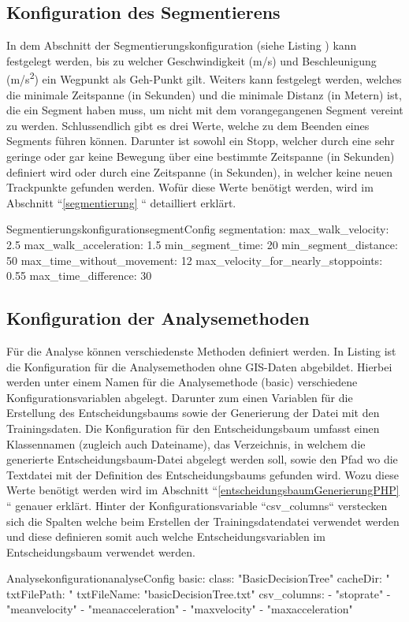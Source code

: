 \subsection{Konfiguration des Segmentierens}
In dem Abschnitt der Segmentierungskonfiguration (siehe Listing ) kann festgelegt werden, bis zu welcher Geschwindigkeit (m/s) und Beschleunigung (m/s\textsuperscript{2}) ein Wegpunkt als Geh-Punkt gilt. Weiters kann festgelegt werden, welches die minimale Zeitspanne (in Sekunden) und die minimale Distanz (in Metern) ist, die ein Segment haben muss, um nicht mit dem vorangegangenen Segment vereint zu werden. Schlussendlich gibt es drei Werte, welche zu dem Beenden eines Segments führen können. Darunter ist sowohl ein Stopp, welcher durch eine sehr geringe oder gar keine Bewegung über eine bestimmte Zeitspanne (in Sekunden) definiert wird oder durch eine Zeitspanne (in Sekunden), in welcher keine neuen Trackpunkte gefunden werden. Wofür diese Werte benötigt werden, wird im Abschnitt ``\ref{segmentierung} `` detailliert erklärt.

\begin{code}[]{Segmentierungskonfiguration}{segmentConfig}
  segmentation:
    max_walk_velocity: 2.5
    max_walk_acceleration: 1.5
    min_segment_time: 20
    min_segment_distance: 50
    max_time_without_movement: 12
    max_velocity_for_nearly_stoppoints: 0.55
    max_time_difference: 30
\end{code}

\subsection{Konfiguration der Analysemethoden}
Für die Analyse können verschiedenste Methoden definiert werden. In Listing  ist die Konfiguration für die Analysemethoden ohne GIS-Daten abgebildet. Hierbei werden unter einem Namen für die Analysemethode (basic) verschiedene Konfigurationsvariablen abgelegt. Darunter zum einen Variablen für die Erstellung des Entscheidungsbaums sowie der Generierung der Datei mit den Trainingsdaten. Die Konfiguration für den Entscheidungsbaum umfasst einen Klassennamen (zugleich auch Dateiname), das Verzeichnis, in welchem die generierte Entscheidungsbaum-Datei abgelegt werden soll, sowie den Pfad wo die Textdatei mit der Definition des Entscheidungsbaums gefunden wird. Wozu diese Werte benötigt werden wird im Abschnitt ``\ref{entscheidungsbaumGenerierungPHP} `` genauer erklärt. Hinter der Konfigurationsvariable ``csv\_columns`` verstecken sich die Spalten welche beim Erstellen der Trainingsdatendatei verwendet werden und diese definieren somit auch welche Entscheidungsvariablen im Entscheidungsbaum verwendet werden.

\begin{code}[]{Analysekonfiguration}{analyseConfig}
    basic:
      class: "BasicDecisionTree"
      cacheDir: "%
      txtFilePath: "%
      txtFileName: "basicDecisionTree.txt"
      csv_columns:
        - "stoprate"
        - "meanvelocity"
        - "meanacceleration"
        - "maxvelocity"
        - "maxacceleration"
\end{code}
